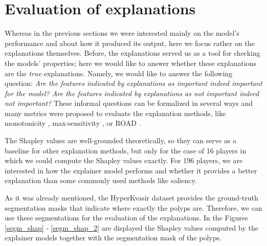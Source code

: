 \documentclass[magisterska,en]{pracamgr}
\begin{document}
\section{Evaluation of explanations}\label{s:evaluation}
Whereas in the previous sections we were interested mainly on the model's performance and about how it produced its output, here we focus rather on the explanations themselves. Before, the explanations served us as a tool for checking the models' properties; here we would like to answer whether these explanations are the \textit{true} explanations. Namely, we would like to answer the following question: \textit{Are the features indicated by explanations as important indeed important for the model? Are the features indicated by explanations as not important indeed not important?} These informal questions can be formalized in several ways and many metrics were proposed to evaluate the explanation methods, like monotonicity \cite{DBLP:journals/corr/abs-2007-07584}, max-sensitivity \cite{DBLP:conf/nips/YehHSIR19}, or ROAD \cite{DBLP:conf/icml/RongLBKK22}.

The Shapley values are well-grounded theoretically, so they can serve as a baseline for other explanation methods, but only for the case of 16 players in which we could compute the Shapley values exactly. For 196 players, we are interested in how the explainer model performs and whether it provides a better explanation than some commonly used methods like saliency.





As it was already mentioned, the HyperKvasir dataset provides the ground-truth segmentation masks that indicate where exactly the polyps are. Therefore, we can use these segmentations for the evaluation of the explanations. 
In the Figures \ref{segm_shap} - \ref{segm_shap_2} are displayed the Shapley values computed by the explainer models together with the segmentation mask of the polyps.

\pagebreak
\end{document}
